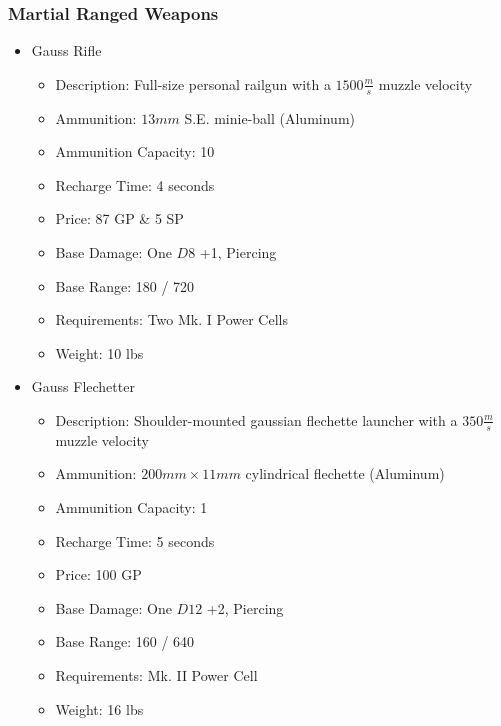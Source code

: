 \documentclass[12pt, landscape]{article}
\begin{document}
\begin{FlushLeft}
\begin{multicols}{2}
			\subsubsection{Martial Ranged Weapons}
			\begin{itemize}
				\item Gauss Rifle
				\begin{itemize}
					\item Description: Full-size personal railgun with a $1500 \frac{m}{s}$ muzzle velocity
					\item Ammunition: $13mm$ S.E. minie-ball (Aluminum)
					\item Ammunition Capacity: 10
					\item Recharge Time: 4 seconds
					\item Price: 87 GP \& 5 SP
					\item Base Damage: One $D8$ +1, Piercing
					\item Base Range: 180 / 720
					\item Requirements: Two Mk. I Power Cells
					\item Weight: 10 lbs
				\end{itemize}
				\item Gauss Flechetter
				\begin{itemize}
					\item Description: Shoulder-mounted gaussian flechette launcher with a $350 \frac{m}{s}$ muzzle velocity
					\item Ammunition: $200mm \times 11mm$ cylindrical flechette (Aluminum)
					\item Ammunition Capacity: 1
					\item Recharge Time: 5 seconds
					\item Price: 100 GP
					\item Base Damage: One $D12$ +2, Piercing
					\item Base Range: 160 / 640
					\item Requirements: Mk. II Power Cell
					\item Weight: 16 lbs
				\end{itemize}
			\end{itemize}


\end{multicols}
\end{FlushLeft}
\end{document}
